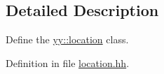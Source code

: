 \subsection{Detailed Description}
Define the \hyperlink{classyy_1_1location}{yy\-::location} class. 

Definition in file \hyperlink{location_8hh_source}{location.\-hh}.

